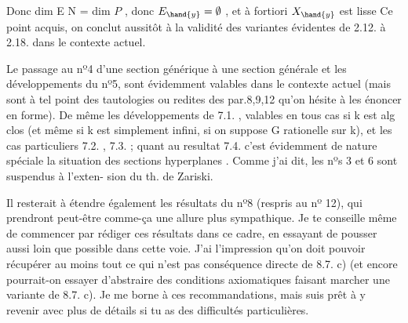 
Donc dim E \hand{$<$} N = dim $P$ , donc $E_{\hand{y}} = \emptyset$ , et à fortiori $X_{\hand{y}}$ est lisse
Ce point acquis, on conclut aussitôt à la validité des variantes
évidentes de 2.12. à 2.18. dans le contexte actuel.

Le passage au nº4 d'une section générique à une section générale
et les développements du nº5, sont évidemment valables dans le contexte
actuel (mais sont à tel point des tautologies ou redites des
par.8,9,12 \xout{)} qu'on hésite à les énoncer en forme). De même les
développements de 7.1. , valables en tous cas si k est  alg clos
(et même si k est simplement infini, si on suppose G rationelle sur k),
et les cas particuliers 7.2. , 7.3. ; quant au resultat 7.4. 
c'est évidemment  de nature spéciale   la situation des sections
hyperplanes . Comme j'ai dit, les nºs 3 et 6 sont suspendus à l'exten-%
sion du th. de Zariski.

Il resterait à étendre également les résultats du nº8 (respris au
nº 12), qui prendront peut-être comme-ça une allure plus sympathique.
Je te conseille même de commencer par rédiger ces résultats dans ce cadre,
en essayant de pousser aussi loin que possible dans cette voie. J'ai
l'impression qu'on doit pouvoir récupérer au moins tout ce qui n'est pas
conséquence directe de 8.7. c) (et encore pourrait-on essayer
d'abstraire des conditions axiomatiques faisant marcher une variante de
8.7. c). Je me borne à ces recommandations, mais suis prêt à y revenir
avec plus de détails si tu as des difficultés particulières.


